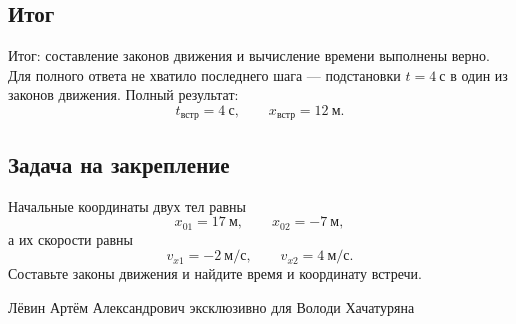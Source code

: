 \documentclass[12pt,a4paper]{article}
\begin{document}
\subsection*{Итог}
\textcolor{teal!60!black}{Итог:} составление законов движения и вычисление времени выполнены верно. Для полного ответа не хватило последнего шага --- подстановки $t=4\ \text{с}$ в один из законов движения. Полный результат:
\[
\boxed{t_{\text{встр}}=4\ \text{с},\qquad x_{\text{встр}}=12\ \text{м}}.
\]

\subsection*{Задача на закрепление}
Начальные координаты двух тел равны
\[
x_{01}=17\ \text{м},\qquad x_{02}=-7\ \text{м},
\]
а их скорости равны
\[
v_{x1}=-2\ \text{м/с},\qquad v_{x2}=4\ \text{м/с}.
\]
Составьте законы движения и найдите время и координату встречи.

\vfill
\begin{center}
\small Лёвин Артём Александрович эксклюзивно для Володи Хачатуряна
\end{center}
\end{document}

